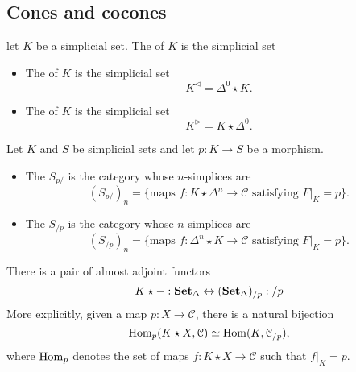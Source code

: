 \documentclass[main.tex]{subfiles}
\begin{document}
\subsection{Cones and cocones}
\label{ssc:cones_and_cocones}

\begin{definition}
  \label{def:left_cone_right_cone}
  let $K$ be a simplicial set. The  of $K$ is the simplicial set
  \begin{itemize}
    \item The  of $K$ is the simplicial set
      \begin{equation*}
        K^{\triangleleft} = \Delta^{0} \star K.
      \end{equation*}

    \item The  of $K$ is the simplicial set
      \begin{equation*}
        K^{\triangleright} = K \star \Delta^{0}.
      \end{equation*}
  \end{itemize}
\end{definition}


\begin{definition}
  \label{def:overcategory}
  Let $K$ and $S$ be simplicial sets and let $p\colon K \to S$ be a morphism.
  \begin{itemize}
    \item The  $S_{p/}$ is the category whose $n$-simplices are
      \begin{equation*}
        (S_{p/})_{n} = \{\text{maps }f\colon K \star \Delta^{n} \to \mathcal{C} \text{ satisfying }F|_{K} = p\}.
      \end{equation*}

    \item The  $S_{/p}$ is the category whose $n$-simplices are
      \begin{equation*}
        (S_{/p})_{n} = \{\text{maps }f\colon \Delta^{n} \star K \to \mathcal{C} \text{ satisfying }F|_{K} = p\}.
      \end{equation*}
  \end{itemize}
\end{definition}

\begin{theorem}
  \label{thm:almost_adjunction_for_undercategories}
  There is a pair of almost adjoint functors
  \begin{equation*}
    K \star - : \operatorname{\mathbf{Set}_{\Delta}} \leftrightarrow (\operatorname{\mathbf{Set}_{\Delta}})_{/p} : /p
  \end{equation*}
  More explicitly, given a map $p\colon X \to \mathcal{C}$, there is a natural bijection
  \begin{equation*}
    \operatorname{Hom}_{p}(K \star X, \mathcal{C}) \simeq \operatorname{Hom}(K, \mathcal{C}_{/p}),
  \end{equation*}
  where $\operatorname{Hom}_{p}$ denotes the set of maps $f\colon K \star X \to \mathcal{C}$ such that $f|_{K} = p$.
\end{theorem}
\end{document}

